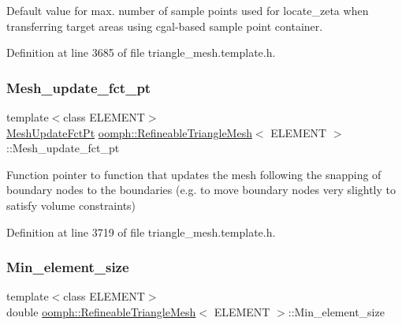 Default value for max. number of sample points used for locate\+\_\+zeta when transferring target areas using cgal-\/based sample point container. 



Definition at line 3685 of file triangle\+\_\+mesh.\+template.\+h.

\mbox{\label{classoomph_1_1RefineableTriangleMesh_a4fbf41991a5b25054d43d6cd9af599a8}} 
\subsubsection{\texorpdfstring{Mesh\+\_\+update\+\_\+fct\+\_\+pt}{Mesh\_update\_fct\_pt}}
{\footnotesize\ttfamily template$<$class E\+L\+E\+M\+E\+NT$>$ \\
\hyperlink{classoomph_1_1RefineableTriangleMesh_aa78ffa56b66a1371aec25e25f7aaff9e}{Mesh\+Update\+Fct\+Pt} \hyperlink{classoomph_1_1RefineableTriangleMesh}{oomph\+::\+Refineable\+Triangle\+Mesh}$<$ E\+L\+E\+M\+E\+NT $>$\+::Mesh\+\_\+update\+\_\+fct\+\_\+pt\hspace{0.3cm}{\ttfamily [protected]}}



Function pointer to function that updates the mesh following the snapping of boundary nodes to the boundaries (e.\+g. to move boundary nodes very slightly to satisfy volume constraints) 



Definition at line 3719 of file triangle\+\_\+mesh.\+template.\+h.

\mbox{\label{classoomph_1_1RefineableTriangleMesh_ab242d22770f3248b35553a3eaf08f877}} 
\subsubsection{\texorpdfstring{Min\+\_\+element\+\_\+size}{Min\_element\_size}}
{\footnotesize\ttfamily template$<$class E\+L\+E\+M\+E\+NT$>$ \\
double \hyperlink{classoomph_1_1RefineableTriangleMesh}{oomph\+::\+Refineable\+Triangle\+Mesh}$<$ E\+L\+E\+M\+E\+NT $>$\+::Min\+\_\+element\+\_\+size\hspace{0.3cm}{\ttfamily [protected]}}



